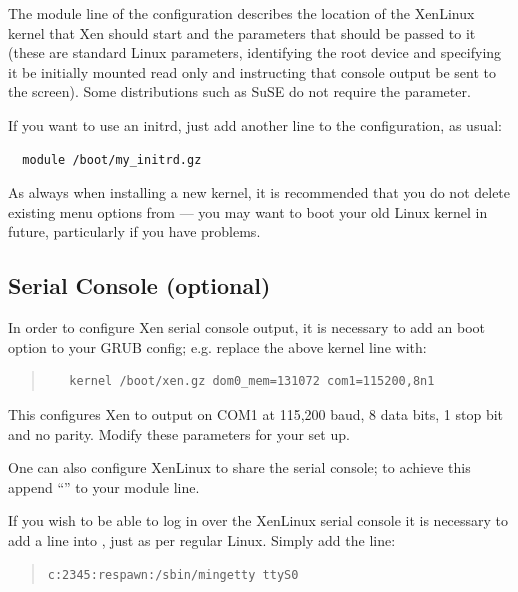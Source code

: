 \documentclass[11pt,twoside,final,openright]{report}
\begin{document}
The module line of the configuration describes the location of the
XenLinux kernel that Xen should start and the parameters that should
be passed to it (these are standard Linux parameters, identifying the
root device and specifying it be initially mounted read only and
instructing that console output be sent to the screen).  Some
distributions such as SuSE do not require the  parameter.



If you want to use an initrd, just add another  line to
the configuration, as usual:
{\small
\begin{verbatim}
  module /boot/my_initrd.gz
\end{verbatim}
}

As always when installing a new kernel, it is recommended that you do
not delete existing menu options from  --- you may want
to boot your old Linux kernel in future, particularly if you
have problems.


\subsection{Serial Console (optional)}



In order to configure Xen serial console output, it is necessary to add 
an boot option to your GRUB config; e.g. replace the above kernel line 
with: 
\begin{quote}
{\small
\begin{verbatim}
   kernel /boot/xen.gz dom0_mem=131072 com1=115200,8n1
\end{verbatim}}
\end{quote} 

This configures Xen to output on COM1 at 115,200 baud, 8 data bits, 
1 stop bit and no parity. Modify these parameters for your set up. 

One can also configure XenLinux to share the serial console; to 
achieve this append ``'' to your 
module line. 


If you wish to be able to log in over the XenLinux serial console it
is necessary to add a line into , just as per 
regular Linux. Simply add the line:
\begin{quote}
{\small 
{\tt c:2345:respawn:/sbin/mingetty ttyS0}
}
\end{quote} 
\end{document}
